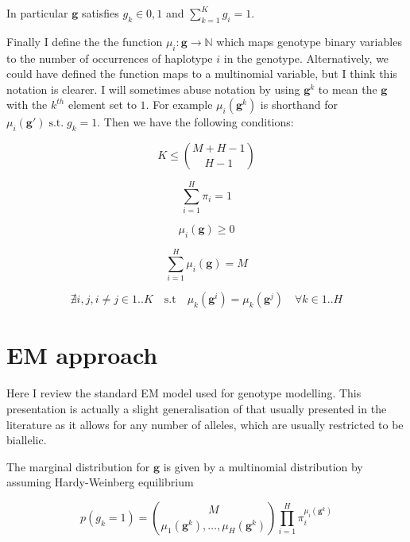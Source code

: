 \documentclass{article}
\begin{document}
In particular $\boldsymbol{g}$ satisfies $g_k \in {0, 1}$ and $\sum_{k = 1}^{K} g_i = 1$.

Finally I define the the function $\mu_i : \boldsymbol{g} \rightarrow \mathbb{N}$ which maps genotype binary variables to the number of occurrences of haplotype $i$ in the genotype. Alternatively, we could have defined the function maps to a multinomial variable, but I think this notation is clearer. I will sometimes abuse notation by using $\boldsymbol{g}^k$ to mean the $\boldsymbol{g}$ with the $k^{th}$ element set to $1$. For example $\mu_i(\boldsymbol{g}^k)$ is shorthand for $\mu_i(\boldsymbol{g}') \; \text{s.t.} \; g_k = 1$. Then we have the following conditions:

\begin{equation} 
    K \le \binom{M + H - 1}{H - 1}
\end{equation}

\begin{equation} 
    \sum_{i = 1}^{H} \pi_i = 1
\end{equation}

\begin{equation} 
    \mu_i(\boldsymbol{g}) \ge 0
\end{equation}

\begin{equation} 
    \sum_{i = 1}^{H} \mu_i(\boldsymbol{g}) = M
\end{equation}

\begin{equation} 
    \nexists i,j, i \ne j\in {1..K} \quad \text{s.t} \quad \mu_k(\boldsymbol{g}^i) = \mu_k(\boldsymbol{g}^j) \quad \forall k \in {1..H}
\end{equation}

\section{EM approach}

Here I review the standard EM model used for genotype modelling. This presentation is actually a slight generalisation of that usually presented in the literature as it allows for any number of alleles, which are usually restricted to be biallelic.

The marginal distribution for $\boldsymbol{g}$ is given by a multinomial distribution by assuming Hardy-Weinberg equilibrium

\begin{equation} 
    p(g_k = 1) = \binom{M}{\mu_1(\boldsymbol{g}^k),\dots,\mu_H(\boldsymbol{g}^k)} \prod_{i = 1}^H \pi_i^{\mu_i(\boldsymbol{g}^k)}
\end{equation}
\end{document}
